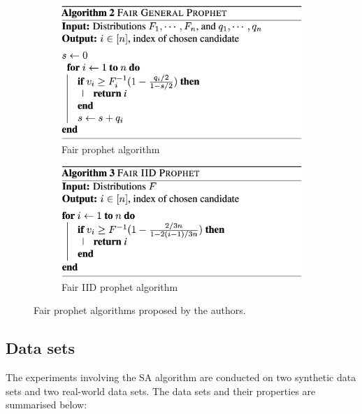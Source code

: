 \begin{figure}[h!]
    \centering
    \begin{subfigure}[t!]{0.475\textwidth}
         \centering
        \includegraphics[width=1\textwidth]{media/generalpro.png}
        \caption{Fair prophet algorithm}
        \label{fig:genpro}
    \end{subfigure}
    \hfill
    \begin{subfigure}[t!]{0.475\textwidth}
        \centering
        \includegraphics[width=1\textwidth]{media/iddpro.png}
        \caption{Fair IID prophet algorithm}
        \label{fig:iidpro}
    \end{subfigure}
    \caption{Fair prophet algorithms proposed by the authors.}
    \label{fig:prophetalgos}
\end{figure}


\subsection{Data sets}
The experiments involving the SA algorithm are conducted on two synthetic data sets and two real-world data sets. The data sets and their properties are summarised below:

